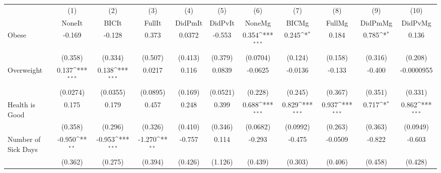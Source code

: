 {
\def\sym#1{\ifmmode^{#1}\else\(^{#1}\)\fi}
\begin{tabular}{l*{10}{c}}
\toprule
            &\multicolumn{1}{c}{(1)}&\multicolumn{1}{c}{(2)}&\multicolumn{1}{c}{(3)}&\multicolumn{1}{c}{(4)}&\multicolumn{1}{c}{(5)}&\multicolumn{1}{c}{(6)}&\multicolumn{1}{c}{(7)}&\multicolumn{1}{c}{(8)}&\multicolumn{1}{c}{(9)}&\multicolumn{1}{c}{(10)}\\
            &\multicolumn{1}{c}{NoneIt}&\multicolumn{1}{c}{BICIt}&\multicolumn{1}{c}{FullIt}&\multicolumn{1}{c}{DidPmIt}&\multicolumn{1}{c}{DidPvIt}&\multicolumn{1}{c}{NoneMg}&\multicolumn{1}{c}{BICMg}&\multicolumn{1}{c}{FullMg}&\multicolumn{1}{c}{DidPmMg}&\multicolumn{1}{c}{DidPvMg}\\
\midrule
Obese       &      -0.169         &      -0.128         &       0.373         &      0.0372         &      -0.553         &       0.354\sym{***}&       0.245\sym{*}  &       0.184         &       0.785\sym{*}  &       0.136         \\
            &     (0.358)         &     (0.334)         &     (0.507)         &     (0.413)         &     (0.379)         &    (0.0704)         &     (0.124)         &     (0.158)         &     (0.316)         &     (0.208)         \\
\addlinespace
Overweight  &       0.137\sym{***}&       0.138\sym{***}&      0.0217         &       0.116         &      0.0839         &     -0.0625         &     -0.0136         &      -0.133         &      -0.400         &  -0.0000955         \\
            &    (0.0274)         &    (0.0355)         &    (0.0895)         &     (0.169)         &    (0.0521)         &     (0.228)         &     (0.245)         &     (0.367)         &     (0.351)         &     (0.331)         \\
\addlinespace
Health is Good&       0.175         &       0.179         &       0.457         &       0.248         &       0.399         &       0.688\sym{***}&       0.829\sym{***}&       0.937\sym{***}&       0.717\sym{*}  &       0.862\sym{***}\\
            &     (0.358)         &     (0.296)         &     (0.326)         &     (0.410)         &     (0.346)         &    (0.0682)         &    (0.0992)         &     (0.263)         &     (0.363)         &    (0.0949)         \\
\addlinespace
Number of Sick Days&      -0.950\sym{**} &      -0.953\sym{***}&      -1.270\sym{**} &      -0.757         &       0.114         &      -0.293         &      -0.475         &     -0.0509         &      -0.822         &      -0.603         \\
            &     (0.362)         &     (0.275)         &     (0.394)         &     (0.426)         &     (1.126)         &     (0.439)         &     (0.303)         &     (0.406)         &     (0.458)         &     (0.428)         \\
\bottomrule
\end{tabular}
}
